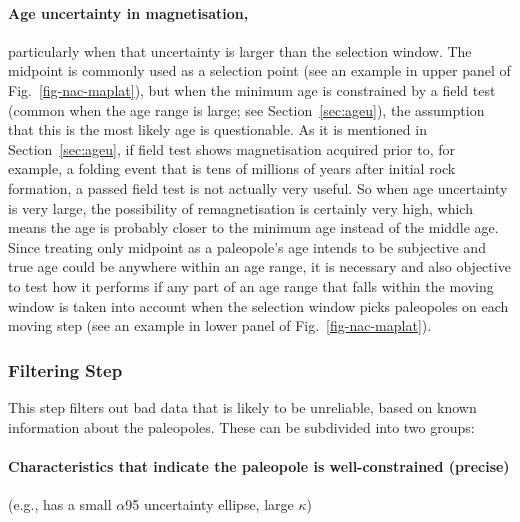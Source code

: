 \paragraph{Age uncertainty in magnetisation,}
particularly when that uncertainty is larger than the selection window. The
midpoint is commonly used as a selection point (see an example in upper panel
of Fig.~\ref{fig-nac-maplat}), but when the minimum age is constrained by a
field test (common when the age range is large; see Section~\ref{sec:ageu}), the
assumption that this is the most likely age is questionable. As it is mentioned
in Section~\ref{sec:ageu}, if field test shows magnetisation acquired prior to,
for example, a folding event that is tens of millions of years after initial
rock formation, a passed field test is not actually very useful. So when age
uncertainty is very large, the possibility of remagnetisation is certainly very
high, which means the age is probably closer to the minimum age instead of the
middle age. Since treating only midpoint as a paleopole's age intends to be
subjective and true age could be anywhere within an age range, it is necessary
and also objective to test how it performs if any part of an age range that
falls within the moving window is taken into account when the selection window
picks paleopoles on each moving step (see an example in lower panel of
Fig.~\ref{fig-nac-maplat}).

\subsubsection{Filtering Step}

This step filters out bad data that is likely to be unreliable, based on known
information about the paleopoles. These can be subdivided into two groups:

\paragraph{Characteristics that indicate the paleopole is well-constrained
(precise)}
(e.g., has a small $\alpha$95 uncertainty ellipse, large $\kappa$)

